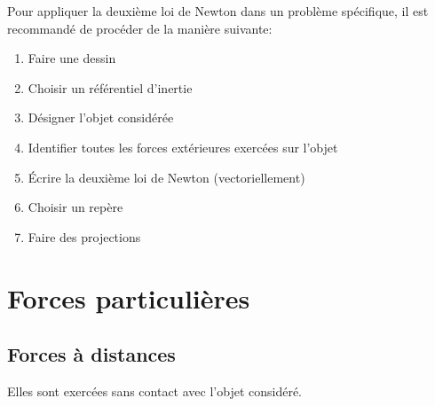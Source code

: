 \documentclass[
    11pt,
    a4paper,
    oneside,
    headinlcude, footinclude,
    twoside,
]{report}
\begin{document}
\begin{highlightBox}[frametitle={Méthodologie}]
    Pour appliquer la deuxième loi de Newton dans un problème spécifique, il
    est recommandé de procéder de la manière suivante:
    \begin{enumerate}
        \item Faire une dessin
        \item Choisir un référentiel d'inertie
        \item Désigner l'objet considérée
        \item Identifier toutes les forces extérieures exercées sur l'objet
        \item Écrire la deuxième loi de Newton (vectoriellement)
        \item Choisir un repère
        \item Faire des projections
    \end{enumerate}
\end{highlightBox}

\section{Forces particulières}
\label{sec:forces_particulieres}

\subsection{Forces à distances}
\label{sub:forces_a_distances}

Elles sont exercées sans contact avec l'objet considéré.
\end{document}
